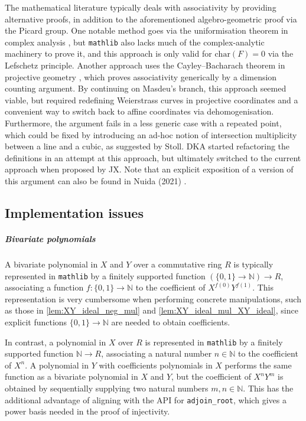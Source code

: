\documentclass[a4paper,UKenglish,cleveref,autoref,thm-restate]{lipics-v2021}
\begin{document}
The mathematical literature typically deals with associativity by providing alternative proofs, in addition to the aforementioned algebro-geometric proof via the Picard group. One notable method goes via the uniformisation theorem in complex analysis \cite[Corollary VI.5.1.1]{silverman}, but \texttt{mathlib} also lacks much of the complex-analytic machinery to prove it, and this approach is only valid for $ \mathrm{char}(F) = 0 $ via the Lefschetz principle. Another approach uses the Cayley--Bacharach theorem in projective geometry \cite[Lemma 7.1]{cassels}, which proves associativity generically by a dimension counting argument. By continuing on Masdeu's branch, this approach seemed viable, but required redefining Weierstrass curves in projective coordinates and a convenient way to switch back to affine coordinates via dehomogenisation. Furthermore, the argument fails in a less generic case with a repeated point, which could be fixed by introducing an ad-hoc notion of intersection multiplicity between a line and a cubic, as suggested by Stoll. DKA started refactoring the definitions in an attempt at this approach, but ultimately switched to the current approach when proposed by JX. Note that an explicit exposition of a version of this argument can also be found in Nuida (2021) \cite{nuida}.

\subsection{Implementation issues}
\label{sec:implementation}

\subparagraph{Bivariate polynomials}

A bivariate polynomial in $ X $ and $ Y $ over a commutative ring $ R $ is typically represented in \texttt{mathlib} by a finitely supported function $ (\{0, 1\} \to \mathbb{N}) \to R $, associating a function $ f : \{0, 1\} \to \mathbb{N} $ to the coefficient of $ X^{f(0)}Y^{f(1)} $. This representation is very cumbersome when performing concrete manipulations, such as those in \cref{lem:XY_ideal_neg_mul} and \cref{lem:XY_ideal_mul_XY_ideal}, since explicit functions $ \{0, 1\} \to \mathbb{N} $ are needed to obtain coefficients.

In contrast, a polynomial in $ X $ over $ R $ is represented in \texttt{mathlib} by a finitely supported function $ \mathbb{N} \to R $, associating a natural number $ n \in \mathbb{N} $ to the coefficient of $ X^n $. A polynomial in $ Y $ with coefficients polynomials in $ X $ performs the same function as a bivariate polynomial in $ X $ and $ Y $, but the coefficient of $ X^nY^m $ is obtained by sequentially supplying two natural numbers $ m, n \in \mathbb{N} $. This has the additional advantage of aligning with the API for \texttt{adjoin\_root}, which gives a power basis needed in the proof of injectivity.
\end{document}
